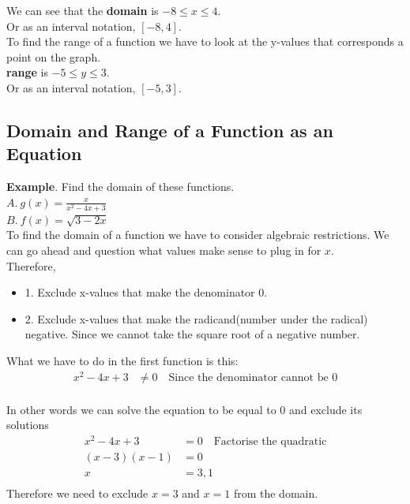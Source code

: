 We can see that the \textbf{domain} is $-8 \le x \le 4$. \\
Or as an interval notation, $[-8, 4]$. \\

To find the range of a function we have to look at the y-values that corresponds a point on the graph. \\
\textbf{range} is $-5 \le y \le 3$. \\
Or as an interval notation, $[-5, 3]$. \\

\subsection{Domain and Range of a Function as an Equation}
\textbf{Example}. Find the domain of these functions. \\
$\displaystyle A. \ g(x) = \frac{x}{x^2 - 4x + 3}$ \\
$\displaystyle B. \ f(x) = \sqrt{3-2x}$ \\
To find the domain of a function we have to consider algebraic restrictions. We can go ahead and question what values make sense to plug in for $x$. \\
Therefore,
\begin{itemize}
	\item 1. Exclude x-values that make the denominator 0.
	\item 2. Exclude x-values that make the radicand(number under the radical) negative. Since we cannot take the square root of a negative number.
\end{itemize}

What we have to do in the first function is this:
\begin{align*}
	x^2-4x+3 & \neq 0 \quad \text{Since the denominator cannot be 0} \\
\end{align*}

In other words we can solve the equation to be equal to 0 and exclude its solutions
\begin{align*}
	x^2-4x+3   & = 0 \quad \text{Factorise the quadratic} \\
	(x-3)(x-1) & = 0                                      \\
	x          & = 3, 1                                   \\
\end{align*}
Therefore we need to exclude $x=3$ and $x=1$ from the domain. \\

